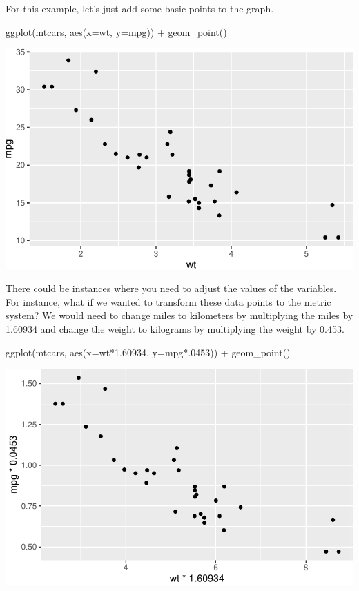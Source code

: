\documentclass[
  letterpaper,
  DIV=11,
  numbers=noendperiod]{scrreprt}
\newenvironment{Shaded}{\begin{snugshade}}{\end{snugshade}}
\newcommand{\AttributeTok}[1]{\textcolor[rgb]{0.40,0.45,0.13}{#1}}
\newcommand{\DecValTok}[1]{\textcolor[rgb]{0.68,0.00,0.00}{#1}}
\newcommand{\FloatTok}[1]{\textcolor[rgb]{0.68,0.00,0.00}{#1}}
\newcommand{\FunctionTok}[1]{\textcolor[rgb]{0.28,0.35,0.67}{#1}}
\newcommand{\NormalTok}[1]{\textcolor[rgb]{0.00,0.23,0.31}{#1}}
\newcommand{\SpecialCharTok}[1]{\textcolor[rgb]{0.37,0.37,0.37}{#1}}
\begin{document}
For this example, let's just add some basic points to the graph.

\begin{Shaded}
\begin{Highlighting}[]
\FunctionTok{ggplot}\NormalTok{(mtcars, }\FunctionTok{aes}\NormalTok{(}\AttributeTok{x=}\NormalTok{wt, }\AttributeTok{y=}\NormalTok{mpg)) }\SpecialCharTok{+}
  \FunctionTok{geom\_point}\NormalTok{() }
\end{Highlighting}
\end{Shaded}

\includegraphics{Advanced_Scatterplot_Techniques_files/figure-pdf/unnamed-chunk-3-1.pdf}

There could be instances where you need to adjust the values of the
variables. For instance, what if we wanted to transform these data
points to the metric system? We would need to change miles to kilometers
by multiplying the miles by 1.60934 and change the weight to kilograms
by multiplying the weight by 0.453.

\begin{Shaded}
\begin{Highlighting}[]
\FunctionTok{ggplot}\NormalTok{(mtcars, }\FunctionTok{aes}\NormalTok{(}\AttributeTok{x=}\NormalTok{wt}\SpecialCharTok{*}\FloatTok{1.60934}\NormalTok{, }\AttributeTok{y=}\NormalTok{mpg}\SpecialCharTok{*}\NormalTok{.}\DecValTok{0453}\NormalTok{)) }\SpecialCharTok{+}
  \FunctionTok{geom\_point}\NormalTok{() }
\end{Highlighting}
\end{Shaded}

\includegraphics{Advanced_Scatterplot_Techniques_files/figure-pdf/unnamed-chunk-4-1.pdf}
\end{document}
